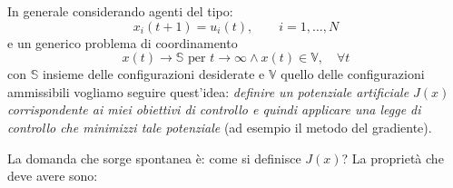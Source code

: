 In generale considerando agenti del tipo:
\begin{equation}
x_i(t+1) = u_i(t), \qquad i=1,\dots, N
\end{equation} e un generico problema di coordinamento
\begin{equation}
x(t) \to \mathbb{S} \text{ per } t \to \infty \land x(t) \in \mathbb{V}, \quad \forall t
\end{equation} con $\mathbb{S}$ insieme delle configurazioni desiderate e $\mathbb{V}$ quello delle configurazioni ammissibili vogliamo seguire quest'idea: \textit{definire un potenziale artificiale $J(x)$ corrispondente ai miei obiettivi di controllo e quindi applicare una legge di controllo che minimizzi tale potenziale} (ad esempio il metodo del gradiente).

La domanda che sorge spontanea \`e: come si definisce $J(x)$? La propriet\`a che deve avere sono:
